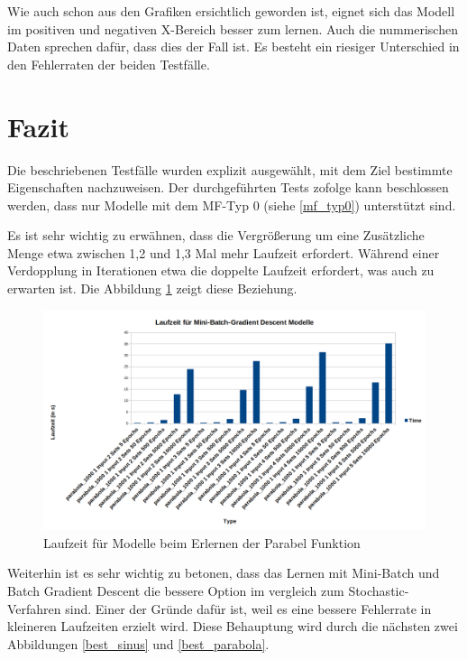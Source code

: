 {Wie auch schon aus den Grafiken ersichtlich geworden ist, eignet sich das Modell im positiven und negativen X-Bereich besser zum lernen. Auch die nummerischen Daten sprechen dafür, dass dies der Fall ist. Es besteht ein riesiger Unterschied in den Fehlerraten der beiden Testfälle.

\section{Fazit}

Die beschriebenen Testfälle wurden explizit ausgewählt, mit dem Ziel bestimmte Eigenschaften nachzuweisen. Der durchgeführten Tests zofolge kann beschlossen werden, dass nur Modelle mit dem MF-Typ 0 (siehe \ref{mf_typ0}) unterstützt sind.

Es ist sehr wichtig zu erwähnen, dass die Vergrößerung um eine Zusätzliche Menge etwa zwischen 1,2 und 1,3 Mal mehr Laufzeit erfordert. Während einer Verdopplung in Iterationen etwa die doppelte Laufzeit erfordert, was auch zu erwarten ist. Die Abbildung \ref{mini_batch_parabel_grafik} zeigt diese Beziehung.

\begin{figure}[htbp]
	\centering
	\includegraphics[width=1\textwidth]{images/charts/Mini-BatchGradientTimeParabola_bold.png}
	\caption{Laufzeit für Modelle beim Erlernen der Parabel Funktion}
	\label{mini_batch_parabel_grafik}
\end{figure}

Weiterhin ist es sehr wichtig zu betonen, dass das Lernen mit Mini-Batch und Batch Gradient Descent die bessere Option im vergleich zum Stochastic-Verfahren sind. Einer der Gründe dafür ist, weil es eine bessere Fehlerrate in kleineren Laufzeiten erzielt wird. Diese Behauptung wird durch die nächsten zwei Abbildungen \ref{best_sinus} und \ref{best_parabola}.

}
